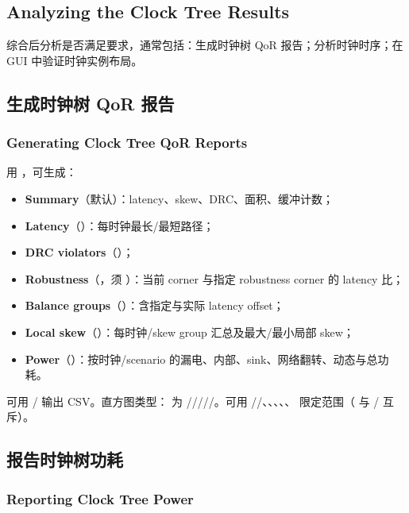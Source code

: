 \subsection*{Analyzing the Clock Tree Results}

综合后分析是否满足要求，通常包括：生成时钟树 QoR 报告；分析时钟时序；在 GUI 中验证时钟实例布局。

\subsection{生成时钟树 QoR 报告}
\subsubsection*{Generating Clock Tree QoR Reports}

用 ，可生成：
\begin{itemize}
  \item \textbf{Summary}（默认）：latency、skew、DRC、面积、缓冲计数；
  \item \textbf{Latency}（）：每时钟最长/最短路径；
  \item \textbf{DRC violators}（）；
  \item \textbf{Robustness}（，须 ）：当前 corner 与指定 robustness corner 的 latency 比；
  \item \textbf{Balance groups}（）：含指定与实际 latency offset；
  \item \textbf{Local skew}（）：每时钟/skew group 汇总及最大/最小局部 skew；
  \item \textbf{Power}（）：按时钟/scenario 的漏电、内部、sink、网络翻转、动态与总功耗。
\end{itemize}
可用 / 输出 CSV。直方图类型： 为 /////。可用 //、、、、、 限定范围（ 与 / 互斥）。

\subsection{报告时钟树功耗}
\subsubsection*{Reporting Clock Tree Power}

